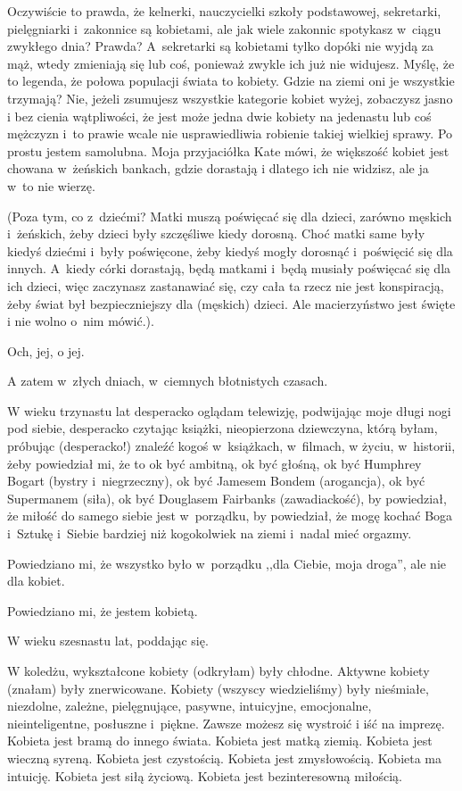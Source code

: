 \documentclass[oneside,polish,12pt,sfheadings]{mwbk}
\begin{document}
Oczywiście to prawda, że kelnerki, nauczycielki szkoły podstawowej,
sekretarki, pielęgniarki i~zakonnice są kobietami, ale jak wiele zakonnic
spotykasz w~ciągu zwykłego dnia? Prawda? A~sekretarki są kobietami
tylko dopóki nie wyjdą za mąż, wtedy zmieniają się lub coś, ponieważ
zwykle ich już nie widujesz. Myślę, że to legenda, że połowa populacji
świata to kobiety. Gdzie na ziemi oni je wszystkie trzymają? Nie,
jeżeli zsumujesz wszystkie kategorie kobiet wyżej, zobaczysz jasno
i bez cienia wątpliwości, że jest może jedna dwie kobiety na jedenastu
lub coś mężczyzn i~to prawie wcale nie usprawiedliwia robienie takiej
wielkiej sprawy. Po prostu jestem samolubna. Moja przyjaciółka Kate
mówi, że większość kobiet jest chowana w~żeńskich bankach, gdzie dorastają
i dlatego ich nie widzisz, ale ja w~to nie wierzę.

(Poza tym, co z~dziećmi? Matki muszą poświęcać się dla dzieci, zarówno
męskich i~żeńskich, żeby dzieci były szczęśliwe kiedy dorosną. Choć
matki same były kiedyś dziećmi i~były poświęcone, żeby kiedyś mogły
dorosnąć i~poświęcić się dla innych. A~kiedy córki dorastają, będą
matkami i~będą musiały poświęcać się dla ich dzieci, więc zaczynasz
zastanawiać się, czy cała ta rzecz nie jest konspiracją, żeby świat
był bezpieczniejszy dla (męskich) dzieci. Ale macierzyństwo jest święte
i nie wolno o~nim mówić.).

Och, jej, o jej.

A zatem w~złych dniach, w~ciemnych błotnistych czasach.

W wieku trzynastu lat desperacko oglądam telewizję, podwijając moje
długi nogi pod siebie, desperacko czytając książki, nieopierzona dziewczyna,
którą byłam, próbując (desperacko!) znaleźć kogoś w~książkach, w~filmach,
w życiu, w~historii, żeby powiedział mi, że to ok być ambitną, ok
być głośną, ok być Humphrey Bogart (bystry i~niegrzeczny), ok być
Jamesem Bondem (arogancja), ok być Supermanem (siła), ok być Douglasem
Fairbanks (zawadiackość), by powiedział, że miłość do samego siebie
jest w~porządku, by powiedział, że mogę kochać Boga i~Sztukę i~Siebie
bardziej niż kogokolwiek na ziemi i~nadal mieć orgazmy.

Powiedziano mi, że wszystko było w~porządku ,,dla Ciebie, moja droga'',
ale nie dla kobiet.

Powiedziano mi, że jestem kobietą.

W wieku szesnastu lat, poddając się.

W koledżu, wykształcone kobiety (odkryłam) były chłodne. Aktywne kobiety
(znałam) były znerwicowane. Kobiety (wszyscy wiedzieliśmy) były nieśmiałe,
niezdolne, zależne, pielęgnujące, pasywne, intuicyjne, emocjonalne,
nieinteligentne, posłuszne i~piękne. Zawsze możesz się wystroić i
iść na imprezę. Kobieta jest bramą do innego świata. Kobieta jest
matką ziemią. Kobieta jest wieczną syreną. Kobieta jest czystością.
Kobieta jest zmysłowością. Kobieta ma intuicję. Kobieta jest siłą
życiową. Kobieta jest bezinteresowną miłością.
\end{document}

